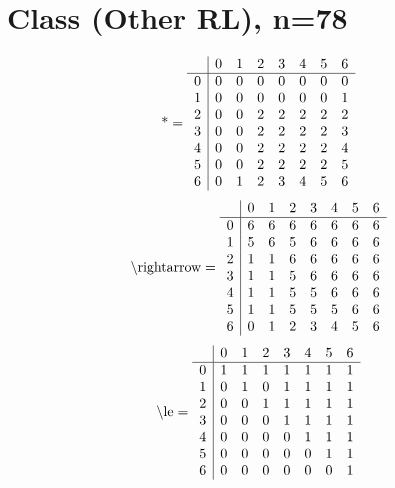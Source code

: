\documentclass[11pt]{article}
\begin{document}
\section{Class (Other RL), n=78}
\[\text{*} = 
\begin{array}{r | r r r r r r r}
 & 0 & 1 & 2 & 3 & 4 & 5 & 6 \\ \hline
0 & 0 & 0 & 0 & 0 & 0 & 0 & 0 \\
1 & 0 & 0 & 0 & 0 & 0 & 0 & 1 \\
2 & 0 & 0 & 2 & 2 & 2 & 2 & 2 \\
3 & 0 & 0 & 2 & 2 & 2 & 2 & 3 \\
4 & 0 & 0 & 2 & 2 & 2 & 2 & 4 \\
5 & 0 & 0 & 2 & 2 & 2 & 2 & 5 \\
6 & 0 & 1 & 2 & 3 & 4 & 5 & 6 \\
\end{array}
\]
\[\text{\textbackslash rightarrow} = 
\begin{array}{r | r r r r r r r}
 & 0 & 1 & 2 & 3 & 4 & 5 & 6 \\ \hline
0 & 6 & 6 & 6 & 6 & 6 & 6 & 6 \\
1 & 5 & 6 & 5 & 6 & 6 & 6 & 6 \\
2 & 1 & 1 & 6 & 6 & 6 & 6 & 6 \\
3 & 1 & 1 & 5 & 6 & 6 & 6 & 6 \\
4 & 1 & 1 & 5 & 5 & 6 & 6 & 6 \\
5 & 1 & 1 & 5 & 5 & 5 & 6 & 6 \\
6 & 0 & 1 & 2 & 3 & 4 & 5 & 6 \\
\end{array}
\]
\[\text{\textbackslash le} = 
\begin{array}{r | r r r r r r r}
 & 0 & 1 & 2 & 3 & 4 & 5 & 6 \\ \hline
0 & 1 & 1 & 1 & 1 & 1 & 1 & 1 \\
1 & 0 & 1 & 0 & 1 & 1 & 1 & 1 \\
2 & 0 & 0 & 1 & 1 & 1 & 1 & 1 \\
3 & 0 & 0 & 0 & 1 & 1 & 1 & 1 \\
4 & 0 & 0 & 0 & 0 & 1 & 1 & 1 \\
5 & 0 & 0 & 0 & 0 & 0 & 1 & 1 \\
6 & 0 & 0 & 0 & 0 & 0 & 0 & 1 \\
\end{array}
\]
\end{document}
